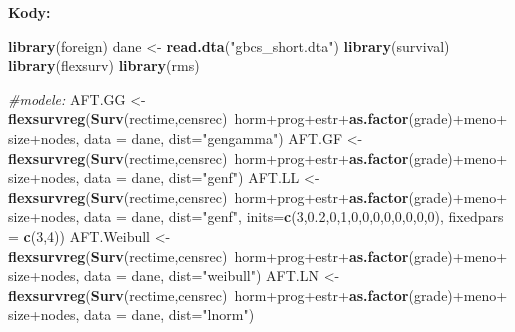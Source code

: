 \documentclass[]{article}
\newenvironment{Shaded}{}{}
\newcommand{\KeywordTok}[1]{\textcolor[rgb]{0.00,0.44,0.13}{\textbf{{#1}}}}
\newcommand{\DataTypeTok}[1]{\textcolor[rgb]{0.56,0.13,0.00}{{#1}}}
\newcommand{\DecValTok}[1]{\textcolor[rgb]{0.25,0.63,0.44}{{#1}}}
\newcommand{\FloatTok}[1]{\textcolor[rgb]{0.25,0.63,0.44}{{#1}}}
\newcommand{\StringTok}[1]{\textcolor[rgb]{0.25,0.44,0.63}{{#1}}}
\newcommand{\CommentTok}[1]{\textcolor[rgb]{0.38,0.63,0.69}{\textit{{#1}}}}
\newcommand{\NormalTok}[1]{{#1}}
\begin{document}
\newpage
\textbf{Kody:}

\begin{Shaded}
\begin{Highlighting}[]
\KeywordTok{library}\NormalTok{(foreign)}
\NormalTok{dane <-}\StringTok{ }\KeywordTok{read.dta}\NormalTok{(}\StringTok{"gbcs_short.dta"}\NormalTok{)}
\KeywordTok{library}\NormalTok{(survival)}
\KeywordTok{library}\NormalTok{(flexsurv)}
\KeywordTok{library}\NormalTok{(rms)}

\CommentTok{#modele:}
\NormalTok{AFT.GG <-}\StringTok{ }\KeywordTok{flexsurvreg}\NormalTok{(}\KeywordTok{Surv}\NormalTok{(rectime,censrec)~horm+prog+estr+}\KeywordTok{as.factor}\NormalTok{(grade)+meno+size+nodes, }
                             \DataTypeTok{data =} \NormalTok{dane, }\DataTypeTok{dist=}\StringTok{"gengamma"}\NormalTok{)}
\NormalTok{AFT.GF <-}\StringTok{ }\KeywordTok{flexsurvreg}\NormalTok{(}\KeywordTok{Surv}\NormalTok{(rectime,censrec)~horm+prog+estr+}\KeywordTok{as.factor}\NormalTok{(grade)+meno+size+nodes, }
                             \DataTypeTok{data =} \NormalTok{dane, }\DataTypeTok{dist=}\StringTok{"genf"}\NormalTok{)}
\NormalTok{AFT.LL <-}\StringTok{ }\KeywordTok{flexsurvreg}\NormalTok{(}\KeywordTok{Surv}\NormalTok{(rectime,censrec)~horm+prog+estr+}\KeywordTok{as.factor}\NormalTok{(grade)+meno+size+nodes, }
                             \DataTypeTok{data =} \NormalTok{dane, }\DataTypeTok{dist=}\StringTok{"genf"}\NormalTok{, }\DataTypeTok{inits=}\KeywordTok{c}\NormalTok{(}\DecValTok{3}\NormalTok{,}\FloatTok{0.2}\NormalTok{,}\DecValTok{0}\NormalTok{,}\DecValTok{1}\NormalTok{,}\DecValTok{0}\NormalTok{,}\DecValTok{0}\NormalTok{,}\DecValTok{0}\NormalTok{,}\DecValTok{0}\NormalTok{,}\DecValTok{0}\NormalTok{,}\DecValTok{0}\NormalTok{,}\DecValTok{0}\NormalTok{,}\DecValTok{0}\NormalTok{), }
                      \DataTypeTok{fixedpars =} \KeywordTok{c}\NormalTok{(}\DecValTok{3}\NormalTok{,}\DecValTok{4}\NormalTok{))}
\NormalTok{AFT.Weibull <-}\StringTok{ }\KeywordTok{flexsurvreg}\NormalTok{(}\KeywordTok{Surv}\NormalTok{(rectime,censrec)~horm+prog+estr+}\KeywordTok{as.factor}\NormalTok{(grade)+meno+size+nodes, }
                              \DataTypeTok{data =} \NormalTok{dane, }\DataTypeTok{dist=}\StringTok{"weibull"}\NormalTok{)}
\NormalTok{AFT.LN <-}\StringTok{ }\KeywordTok{flexsurvreg}\NormalTok{(}\KeywordTok{Surv}\NormalTok{(rectime,censrec)~horm+prog+estr+}\KeywordTok{as.factor}\NormalTok{(grade)+meno+size+nodes, }
                              \DataTypeTok{data =} \NormalTok{dane, }\DataTypeTok{dist=}\StringTok{"lnorm"}\NormalTok{)}


\end{Highlighting}
\end{Shaded}
\end{document}
